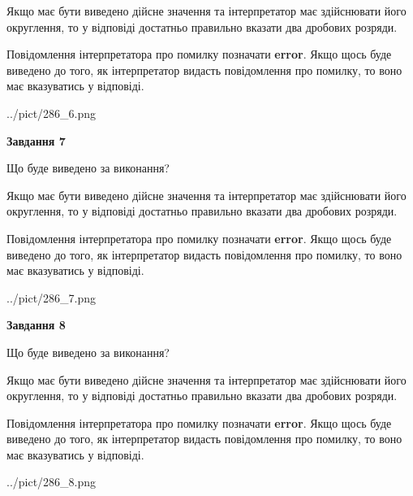 \documentclass[12pt, ukrainian]{article}
\begin{document}
{\begin {Large}
Якщо має бути виведено дійсне значення та інтерпретатор має здійснювати його округлення, 
то у відповіді достатньо правильно вказати два дробових розряди.

Повідомлення інтерпретатора про помилку позначати \textbf{error}.
Якщо щось буде виведено до того, як інтерпретатор видасть повідомлення про помилку, 
то воно має вказуватись у відповіді. \par

\begin{center}
	{../pict/286_6.png}
\end{center}
\newpage

{\begin {center}\textbf{Завдання 7}\end {center}}\par
Що буде виведено за виконання? \par

Якщо має бути виведено дійсне значення та інтерпретатор має здійснювати його округлення, 
то у відповіді достатньо правильно вказати два дробових розряди.

Повідомлення інтерпретатора про помилку позначати \textbf{error}.
Якщо щось буде виведено до того, як інтерпретатор видасть повідомлення про помилку, 
то воно має вказуватись у відповіді. \par

\begin{center}
	{../pict/286_7.png}
\end{center}
\newpage

{\begin {center}\textbf{Завдання 8}\end {center}}\par
Що буде виведено за виконання? \par

Якщо має бути виведено дійсне значення та інтерпретатор має здійснювати його округлення, 
то у відповіді достатньо правильно вказати два дробових розряди.

Повідомлення інтерпретатора про помилку позначати \textbf{error}.
Якщо щось буде виведено до того, як інтерпретатор видасть повідомлення про помилку, 
то воно має вказуватись у відповіді. \par

\begin{center}
	{../pict/286_8.png}
\end{center}
\newpage


\end{Large}}
\end{document}
